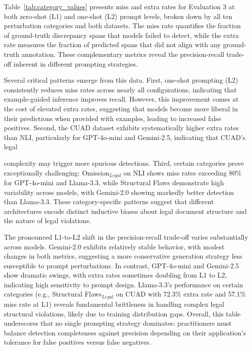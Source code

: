 \documentclass[11pt]{article}
\begin{document}
Table~\ref{tab:category_values} presents miss and extra rates for Evaluation 3 at both zero-shot (L1) and one-shot (L2) prompt levels, broken down by all ten perturbation categories and both datasets. The miss rate quantifies the fraction of ground-truth discrepancy spans that models failed to detect, while the extra rate measures the fraction of predicted spans that did not align with any ground-truth annotation. These complementary metrics reveal the precision-recall trade-off inherent in different prompting strategies.

Several critical patterns emerge from this data. First, one-shot prompting (L2) consistently reduces miss rates across nearly all configurations, indicating that example-guided inference improves recall. However, this improvement comes at the cost of elevated extra rates, suggesting that models become more liberal in their predictions when provided with examples, leading to increased false positives. Second, the CUAD dataset exhibits systematically higher extra rates than NLI, particularly for GPT-4o-mini and Gemini-2.5, indicating that CUAD's legal

 complexity may trigger more spurious detections. Third, certain categories prove exceptionally challenging: Omission$_{Legal}$ on NLI shows miss rates exceeding 80\% for GPT-4o-mini and Llama-3.3, while Structural Flaws demonstrate high variability across models, with Gemini-2.0 showing markedly better detection than Llama-3.3. These category-specific patterns suggest that different architectures encode distinct inductive biases about legal document structure and the nature of legal violations.

The pronounced L1-to-L2 shift in the precision-recall trade-off varies substantially across models. Gemini-2.0 exhibits relatively stable behavior, with modest changes in both metrics, suggesting a more conservative generation strategy less susceptible to prompt perturbations. In contrast, GPT-4o-mini and Gemini-2.5 show dramatic swings, with extra rates sometimes doubling from L1 to L2, indicating high sensitivity to prompt design. Llama-3.3's performance on certain categories (e.g., Structural Flaws$_{Legal}$ on CUAD with 72.3\% extra rate and 57.1\% miss rate at L1) reveals fundamental brittleness in handling complex legal structural violations, likely due to training distribution gaps. Overall, this table underscores that no single prompting strategy dominates: practitioners must balance detection completeness against precision depending on their application's tolerance for false positives versus false negatives.
\end{document}
